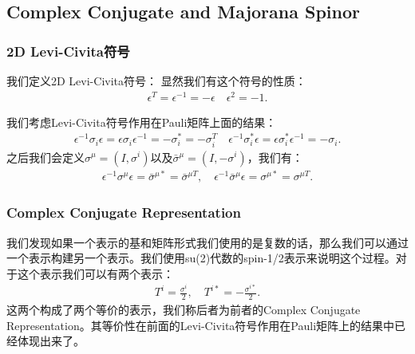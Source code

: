     \subsection{Complex Conjugate and Majorana Spinor}

    \subsubsection{2D Levi-Civita符号}

    \bigskip

    我们定义2D Levi-Civita符号：
    显然我们有这个符号的性质：
    \begin{align}
      \epsilon^T=\epsilon^{-1}=-\epsilon\quad\epsilon^2=-1.
    \end{align}

    \bigskip

    我们考虑Levi-Civita符号作用在Pauli矩阵上面的结果：
    \begin{align}
      \epsilon^{-1}\sigma_i\epsilon=\epsilon\sigma_i\epsilon^{-1}=-\sigma_i^*=-\sigma_i^T\quad\epsilon^{-1}\sigma_i^*\epsilon=\epsilon\sigma_i^*\epsilon^{-1}=-\sigma_i.
    \end{align}
    之后我们会定义$ \sigma^\mu = (I, \sigma^i) $以及$ \bar{\sigma}^\mu = (I,
    -\sigma^i) $，我们有：
    \begin{align}
      \epsilon^{-1}\sigma^\mu\epsilon=\bar{\sigma}^{\mu*} =
      \bar{\sigma}^{\mu
      T},\quad\epsilon^{-1}\bar{\sigma}^\mu\epsilon=\sigma^{\mu*} =
      \sigma^{\mu T}.
    \end{align}

    \subsubsection{Complex Conjugate Representation}

    \bigskip

    我们发现如果一个表示的基和矩阵形式我们使用的是复数的话，那么我们可以通过一个表示构建另一个表示。我们使用su(2)代数的spin-1/2表示来说明这个过程。对于这个表示我们可以有两个表示：
    \begin{align}
      T^i=\frac{\sigma^i}{2},\quad T^{i*}=- \frac{\sigma^{i*}}{2}.
    \end{align}
    这两个构成了两个等价的表示，我们称后者为前者的Complex Conjugate
    Representation。其等价性在前面的Levi-Civita符号作用在Pauli矩阵上的结果中已经体现出来了。

